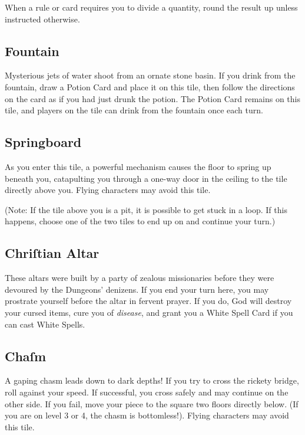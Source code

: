 \documentclass{book}
\begin{document}
\begin{itemize}
When a rule or card requires you to divide a quantity, round the result up unless instructed otherwise.

\subsection{Fountain}

Mysterious jets of water shoot from an ornate stone basin. If you drink from the fountain, draw a Potion Card and place it on this tile, then follow the directions on the card as if you had just drunk the potion. The Potion Card remains on this tile, and players on the tile can drink from the fountain once each turn.  

\subsection{Springboard}

As you enter this tile, a powerful mechanism causes the floor to spring up beneath you, catapulting you through a one-way door in the ceiling to the tile directly above you. Flying characters may avoid this tile.

\small (Note: If the tile above you is a pit, it is possible to get stuck in a loop. If this happens, choose one of the two tiles to end up on and continue your turn.)

\subsection*{Chriſtian Altar}

These altars were built by a party of zealous missionaries before they were devoured by the Dungeons’ denizens. If you end your turn here, you may prostrate yourself before the altar in fervent prayer. If you do, God will destroy your cursed items, cure you of \emph{disease}, and grant you a White Spell Card if you can cast White Spells.

\subsection*{Chaſm}

A gaping chasm leads down to dark depths! If you try to cross the rickety bridge, roll against your speed. If successful, you cross safely and may continue on the other side. If you fail, move your piece to the square two floors directly below. (If you are on level 3 or 4, the chasm is bottomless!).
Flying characters may avoid this tile.


\end{itemize}
\end{document}
